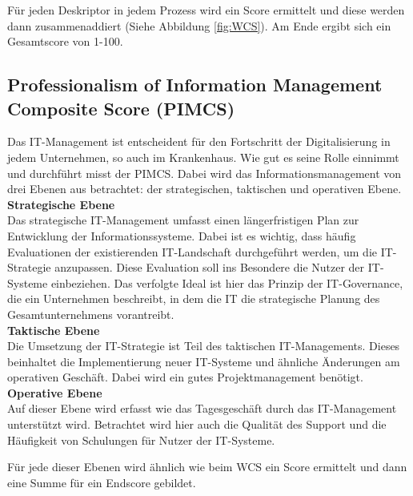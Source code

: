 	Für jeden Deskriptor in jedem Prozess wird ein Score ermittelt und diese werden dann zusammenaddiert (Siehe Abbildung \ref{fig:WCS}). Am Ende ergibt sich ein Gesamtscore von 1-100.
\subsection{Professionalism of Information Management Composite Score (PIMCS)}
	Das IT-Management ist entscheident für den Fortschritt der Digitalisierung in jedem Unternehmen, so auch im Krankenhaus. Wie gut es seine Rolle einnimmt und durchführt misst der PIMCS. Dabei wird das Informationsmanagement von drei Ebenen aus betrachtet: der strategischen, taktischen und operativen Ebene. \parencite{huebner2019}
	\vspace{\parheadvspace}\\
	\textbf{Strategische Ebene}\\
	Das strategische IT-Management umfasst einen längerfristigen Plan zur Entwicklung der Informationssysteme. Dabei ist es wichtig, dass häufig Evaluationen der existierenden IT-Landschaft durchgeführt werden, um die IT-Strategie anzupassen. Diese Evaluation soll ins Besondere die Nutzer der IT-Systeme einbeziehen. Das verfolgte Ideal ist hier das Prinzip der IT-Governance, die ein Unternehmen beschreibt, in dem die IT die strategische Planung des Gesamtunternehmens vorantreibt.
	\vspace{\parheadvspace}\\
	\textbf{Taktische Ebene}\\
	Die Umsetzung der IT-Strategie ist Teil des taktischen IT-Managements. Dieses beinhaltet die Implementierung neuer IT-Systeme und ähnliche Änderungen am operativen Geschäft. Dabei wird ein gutes Projektmanagement benötigt.
	\vspace{\parheadvspace}\\
	\textbf{Operative Ebene}\\
	Auf dieser Ebene wird erfasst wie das Tagesgeschäft durch das IT-Management unterstützt wird. Betrachtet wird hier auch die Qualität des Support und die Häufigkeit von Schulungen für Nutzer der IT-Systeme.

	Für jede dieser Ebenen wird ähnlich wie beim WCS ein Score ermittelt und dann eine Summe für ein Endscore gebildet. \parencite{huebner2019}
